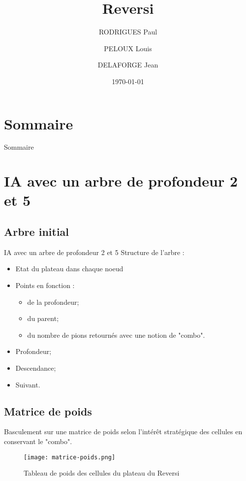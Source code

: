 \documentclass{beamer}
\title{Reversi}
\author{RODRIGUES Paul \and PELOUX Louis \and DELAFORGE Jean}
\date{\today}
\begin{document}
\maketitle

\section*{Sommaire}
\begin{frame}{Sommaire}
    \tableofcontents
\end{frame}

\section{IA avec un arbre de profondeur 2 et 5}
\subsection{Arbre initial}
\begin{frame}{IA avec un arbre de profondeur 2 et 5}
    Structure de l'arbre :
    \begin{itemize}
        \item Etat du plateau dans chaque noeud
        \item Points en fonction :
        \begin{itemize}
            \item de la profondeur;
            \item du parent;
            \item du nombre de pions retournés avec une notion de "combo".
        \end{itemize}
        \item Profondeur;
        \item Descendance;
        \item Suivant.
    \end{itemize}
\end{frame}

\subsection{Matrice de poids}
\begin{frame}
    Basculement sur une matrice de poids selon l'intérêt stratégique des cellules en conservant le "combo".
    \begin{figure}
        \centering
        \texttt{[image: matrice-poids.png]}
        \caption{Tableau de poids des cellules du plateau du Reversi}
        \label{fig:tab-prio}
    \end{figure}
\end{frame}
\end{document}

